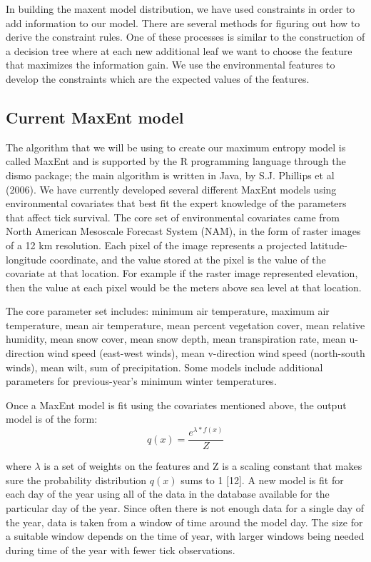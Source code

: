 \noindent In building the maxent model distribution, we have used constraints in order to add information to our model. There are several methods for figuring out how to derive the constraint rules. One of these processes is similar to the construction of a decision tree where at each new additional leaf we want to choose the feature that maximizes the information gain. We use the environmental features to develop the constraints which are the expected values of the features.\newline

\subsection{Current MaxEnt model}

\noindent The algorithm that we will be using to create our maximum entropy model is called MaxEnt and is supported by the R programming language through the dismo package; the main algorithm is written in Java, by S.J. Phillips et al (2006). We have currently developed several different MaxEnt models using environmental covariates that best fit the expert knowledge of the parameters that affect tick survival. The core set of environmental covariates came from North American Mesoscale Forecast System (NAM), in the form of raster images of a 12 km resolution. Each pixel of the image represents a projected latitude-longitude coordinate, and the value stored at the pixel is the value of the covariate at that location. For example if the raster image represented elevation, then the value at each pixel would be the meters above sea level at that location. \newline

\noindent The core parameter set includes: minimum air temperature, maximum air temperature, mean air temperature, mean percent vegetation cover, mean relative humidity, mean snow cover, mean snow depth, mean transpiration rate, mean u-direction wind speed (east-west winds), mean v-direction wind speed (north-south winds), mean wilt, sum of precipitation. Some models include additional parameters for previous-year's minimum winter temperatures.  \newline

\noindent Once a MaxEnt model is fit using the covariates mentioned above, the output model is of the form:
\begin{equation}
q(x) = \frac{e^{\lambda* f(x)}}{Z}
\end{equation}

\noindent where $\lambda $ is a set of weights on the features and Z is a scaling constant that makes sure the probability distribution $q(x)$ sums to 1 [12]. A new model is fit for each day of the year using all of the data in the database available for the particular day of the year. Since often there is not enough data for a single day of the year, data is taken from a window of time around the model day. The size for a suitable window depends on the time of year, with larger windows being needed during time of the year with fewer tick observations.\newline

